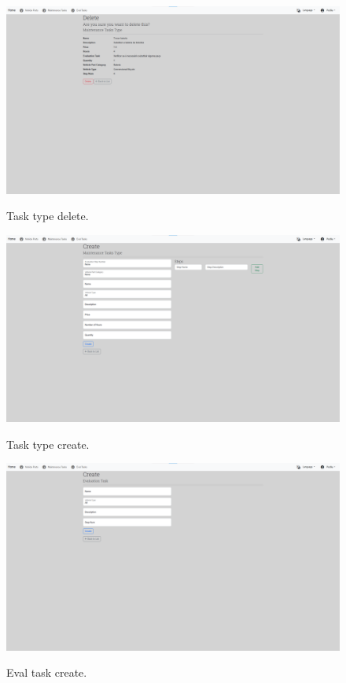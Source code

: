  
\begin{figure}[htbp]
  \caption{Task type delete.}
  \centering
  \includegraphics[width=\textwidth]{figs/Implementation/dealershipAdmin/taskDelete}
  \label{fig:taskDelete}
\end{figure}

\begin{figure}[htbp]
  \caption{Task type create.}
  \centering
  \includegraphics[width=\textwidth]{figs/Implementation/dealershipAdmin/taskCreate}
  \label{fig:taskCreate}
\end{figure}


\begin{figure}[htbp]
  \caption{Eval task create.}
  \centering
  \includegraphics[width=\textwidth]{figs/Implementation/dealershipAdmin/evalCreate}
  \label{fig:evalCreate}
\end{figure}

